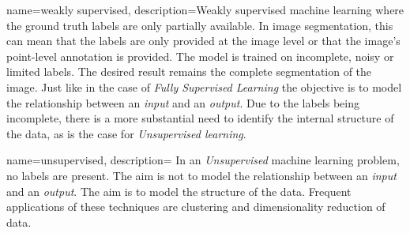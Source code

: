 
{
        name={weakly supervised},
        description={Weakly supervised machine learning where the ground truth labels are only partially available. 
        In image segmentation, this can mean that the labels are only provided at the image level or that the image's point-level annotation is provided.
        The model is trained on incomplete, noisy or limited labels. The desired result remains the complete segmentation of the image.
        Just like in the case of \textit{Fully Supervised Learning} the objective is to model the relationship between an \textit{input} and an \textit{output}. 
        Due to the labels being incomplete, there is a more substantial need to identify the internal structure of the data, as is the case for \textit{Unsupervised learning}.
        }
}




{
        name={unsupervised},
        description={
                In an \textit{Unsupervised} machine learning problem, no labels are present. 
                The aim is not to model the relationship between an \textit{input} and an \textit{output}. The aim is to model the structure of the data.
                Frequent applications of these techniques are clustering and dimensionality reduction of data. 
                }
}

